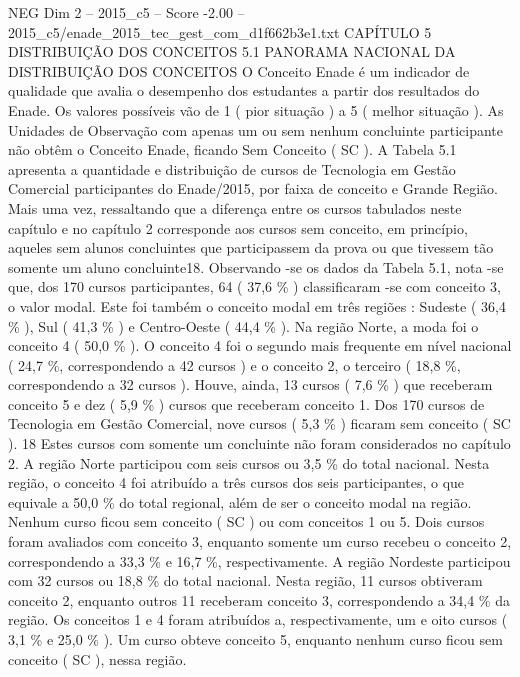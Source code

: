 \begin{textsample}{NEG Dim 2 – 2015\_c5 – Score -2.00 – 2015\_c5/enade\_2015\_tec\_gest\_com\_d1f662b3e1.txt}  \label{ex:f2_neg_151}
CAPÍTULO 5 DISTRIBUIÇÃO DOS CONCEITOS 5.1 PANORAMA NACIONAL DA DISTRIBUIÇÃO DOS CONCEITOS O Conceito Enade é um indicador de qualidade que avalia o desempenho dos estudantes a partir dos resultados do Enade.
Os valores possíveis vão de 1 ( pior situação ) a 5 ( melhor situação ).
As Unidades de Observação com apenas um ou sem nenhum concluinte participante não obtêm o Conceito Enade, ficando Sem Conceito ( SC ).
A Tabela 5.1 apresenta a quantidade e distribuição de cursos de Tecnologia em Gestão Comercial participantes do Enade/2015, por faixa de conceito e Grande Região.
Mais uma vez, ressaltando que a diferença entre os cursos tabulados neste capítulo e no capítulo 2 corresponde aos cursos sem conceito, em princípio, aqueles sem alunos concluintes que participassem da prova ou que tivessem tão somente um aluno concluinte18.
Observando -se os dados da Tabela 5.1, nota -se que, dos 170 cursos participantes, 64 ( 37,6 \% ) classificaram -se com conceito 3, o valor modal.
Este foi também o conceito modal em três regiões : Sudeste ( 36,4 \% ), Sul ( 41,3 \% ) e Centro-Oeste ( 44,4 \% ).
Na região Norte, a moda foi o conceito 4 ( 50,0 \% ).
O conceito 4 foi o segundo mais frequente em nível nacional ( 24,7 \%, correspondendo a 42 cursos ) e o conceito 2, o terceiro ( 18,8 \%, correspondendo a 32 cursos ).
Houve, ainda, 13 cursos ( 7,6 \% ) que receberam conceito 5 e dez ( 5,9 \% ) cursos que receberam conceito 1.
Dos 170 cursos de Tecnologia em Gestão Comercial, nove cursos ( 5,3 \% ) ficaram sem conceito ( SC ). 18 Estes cursos com somente um concluinte não foram considerados no capítulo 2.
A região Norte participou com seis cursos ou 3,5 \% do total nacional.
Nesta região, o conceito 4 foi atribuído a três cursos dos seis participantes, o que equivale a 50,0 \% do total regional, além de ser o conceito modal na região.
Nenhum curso ficou sem conceito ( SC ) ou com conceitos 1 ou 5.
Dois cursos foram avaliados com conceito 3, enquanto somente um curso recebeu o conceito 2, correspondendo a 33,3 \% e 16,7 \%, respectivamente.
A região Nordeste participou com 32 cursos ou 18,8 \% do total nacional.
Nesta região, 11 cursos obtiveram conceito 2, enquanto outros 11 receberam conceito 3, correspondendo a 34,4 \% da região.
Os conceitos 1 e 4 foram atribuídos a, respectivamente, um e oito cursos ( 3,1 \% e 25,0 \% ).
Um curso obteve conceito 5, enquanto nenhum curso ficou sem conceito ( SC ), nessa região.

\end{textsample}
